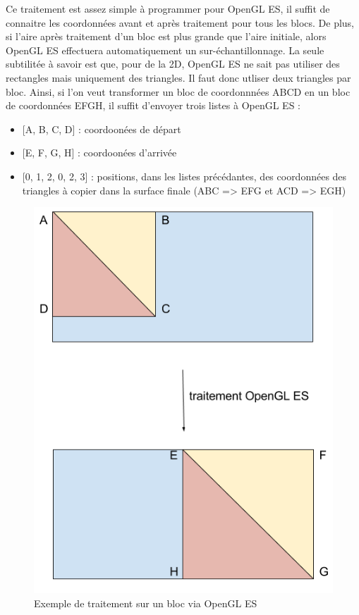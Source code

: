\documentclass[11pt,a4paper]{article}
\begin{document}
\bigbreak
Ce traitement est assez simple à programmer pour OpenGL ES, il suffit de connaitre les coordonnées avant et après traitement pour tous les blocs.
De plus, si l'aire après traitement d'un bloc est plus grande que l'aire initiale, alors OpenGL ES effectuera automatiquement un sur-échantillonnage.
La seule subtilitée à savoir est que, pour de la 2D, OpenGL ES ne sait pas utiliser des rectangles mais uniquement des triangles.
Il faut donc utliser deux triangles par bloc.
Ainsi, si l'on veut transformer un bloc de coordonnnées ABCD en un bloc de coordonnées EFGH, il suffit d'envoyer trois listes à OpenGL ES :

\bigbreak
\begin{itemize}
\item{[A, B, C, D] : coordoonées de départ}
\item{[E, F, G, H] : coordoonées d'arrivée}
\item{[0, 1, 2, 0, 2, 3] : positions, dans les listes précédantes, des coordonnées des triangles à copier dans la surface finale (ABC => EFG et ACD => EGH)}
\end{itemize}

\begin{figure}[H]
\begin{center}
\includegraphics[scale=0.35]{images/OpenGL_ES.png}
\end{center}
\caption{Exemple de traitement sur un bloc via OpenGL ES}
\label{}
\end{figure}
\end{document}
